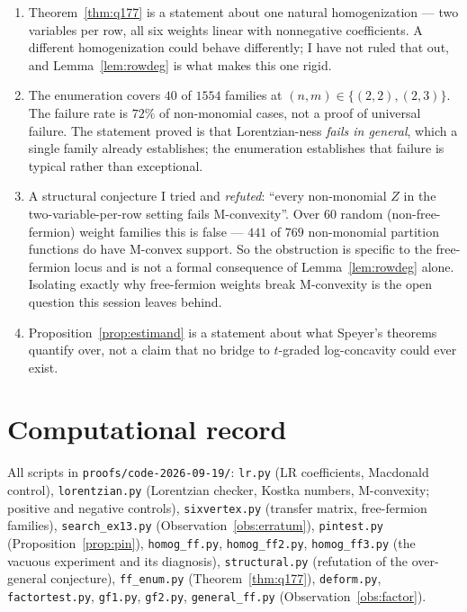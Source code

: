 \documentclass[11pt]{article}
\theoremstyle{definition}
\begin{document}
\begin{enumerate}
\item Theorem~\ref{thm:q177} is a statement about one natural homogenization --- two
variables per row, all six weights linear with nonnegative coefficients. A different
homogenization could behave differently; I have not ruled that out, and
Lemma~\ref{lem:rowdeg} is what makes this one rigid.
\item The enumeration covers $40$ of $1554$ families at $(n,m)\in\{(2,2),(2,3)\}$. The
failure rate is $72\%$ of non-monomial cases, not a proof of universal failure. The
statement proved is that Lorentzian-ness \emph{fails in general}, which a single family
already establishes; the enumeration establishes that failure is typical rather than
exceptional.
\item A structural conjecture I tried and \emph{refuted}: ``every non-monomial $Z$ in the
two-variable-per-row setting fails M-convexity''. Over $60$ random (non-free-fermion) weight
families this is false --- $441$ of $769$ non-monomial partition functions do have M-convex
support. So the obstruction is specific to the free-fermion locus and is not a formal
consequence of Lemma~\ref{lem:rowdeg} alone. Isolating exactly why free-fermion weights
break M-convexity is the open question this session leaves behind.
\item Proposition~\ref{prop:estimand} is a statement about what Speyer's theorems quantify
over, not a claim that no bridge to $t$-graded log-concavity could ever exist.
\end{enumerate}

\section{Computational record}

All scripts in \texttt{proofs/code-2026-09-19/}:
\texttt{lr.py} (LR coefficients, Macdonald control),
\texttt{lorentzian.py} (Lorentzian checker, Kostka numbers, M-convexity; positive and
negative controls),
\texttt{sixvertex.py} (transfer matrix, free-fermion families),
\texttt{search\_ex13.py} (Observation~\ref{obs:erratum}),
\texttt{pintest.py} (Proposition~\ref{prop:pin}),
\texttt{homog\_ff.py}, \texttt{homog\_ff2.py}, \texttt{homog\_ff3.py} (the vacuous
experiment and its diagnosis),
\texttt{structural.py} (refutation of the over-general conjecture),
\texttt{ff\_enum.py} (Theorem~\ref{thm:q177}),
\texttt{deform.py}, \texttt{factortest.py}, \texttt{gf1.py}, \texttt{gf2.py},
\texttt{general\_ff.py} (Observation~\ref{obs:factor}).
\end{document}
